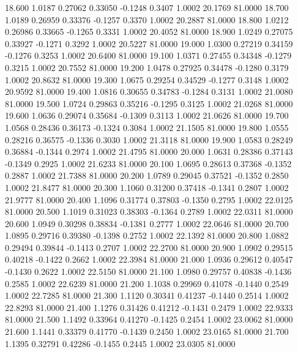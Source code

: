   18.600   1.0187   0.27062   0.33050  -0.1248   0.3407   1.0002  20.1769  81.0000
  18.700   1.0189   0.26959   0.33376  -0.1257   0.3370   1.0002  20.2887  81.0000
  18.800   1.0212   0.26986   0.33665  -0.1265   0.3331   1.0002  20.4052  81.0000
  18.900   1.0249   0.27075   0.33927  -0.1271   0.3292   1.0002  20.5227  81.0000
  19.000   1.0300   0.27219   0.34159  -0.1276   0.3253   1.0002  20.6400  81.0000
  19.100   1.0371   0.27455   0.34348  -0.1279   0.3215   1.0002  20.7552  81.0000
  19.200   1.0478   0.27925   0.34478  -0.1280   0.3179   1.0002  20.8632  81.0000
  19.300   1.0675   0.29254   0.34529  -0.1277   0.3148   1.0002  20.9592  81.0000
  19.400   1.0816   0.30655   0.34783  -0.1284   0.3131   1.0002  21.0080  81.0000
  19.500   1.0724   0.29863   0.35216  -0.1295   0.3125   1.0002  21.0268  81.0000
  19.600   1.0636   0.29074   0.35684  -0.1309   0.3113   1.0002  21.0626  81.0000
  19.700   1.0568   0.28436   0.36173  -0.1324   0.3084   1.0002  21.1505  81.0000
  19.800   1.0555   0.28216   0.36575  -0.1336   0.3030   1.0002  21.3118  81.0000
  19.900   1.0583   0.28249   0.36884  -0.1344   0.2974   1.0002  21.4795  81.0000
  20.000   1.0631   0.28386   0.37143  -0.1349   0.2925   1.0002  21.6233  81.0000
  20.100   1.0695   0.28613   0.37368  -0.1352   0.2887   1.0002  21.7388  81.0000
  20.200   1.0789   0.29045   0.37521  -0.1352   0.2850   1.0002  21.8477  81.0000
  20.300   1.1060   0.31200   0.37418  -0.1341   0.2807   1.0002  21.9777  81.0000
  20.400   1.1096   0.31774   0.37803  -0.1350   0.2795   1.0002  22.0125  81.0000
  20.500   1.1019   0.31023   0.38303  -0.1364   0.2789   1.0002  22.0311  81.0000
  20.600   1.0949   0.30298   0.38834  -0.1381   0.2777   1.0002  22.0646  81.0000
  20.700   1.0895   0.29716   0.39380  -0.1398   0.2752   1.0002  22.1392  81.0000
  20.800   1.0882   0.29494   0.39844  -0.1413   0.2707   1.0002  22.2700  81.0000
  20.900   1.0902   0.29515   0.40218  -0.1422   0.2662   1.0002  22.3984  81.0000
  21.000   1.0936   0.29612   0.40547  -0.1430   0.2622   1.0002  22.5150  81.0000
  21.100   1.0980   0.29757   0.40838  -0.1436   0.2585   1.0002  22.6239  81.0000
  21.200   1.1038   0.29969   0.41078  -0.1440   0.2549   1.0002  22.7285  81.0000
  21.300   1.1120   0.30341   0.41237  -0.1440   0.2514   1.0002  22.8293  81.0000
  21.400   1.1276   0.31426   0.41212  -0.1431   0.2479   1.0002  22.9333  81.0000
  21.500   1.1492   0.33964   0.41270  -0.1425   0.2454   1.0002  23.0062  81.0000
  21.600   1.1441   0.33379   0.41770  -0.1439   0.2450   1.0002  23.0165  81.0000
  21.700   1.1395   0.32791   0.42286  -0.1455   0.2445   1.0002  23.0305  81.0000
